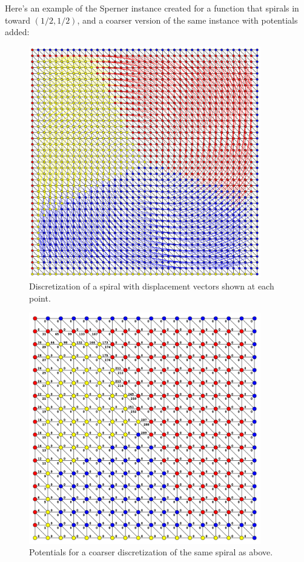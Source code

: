   Here's an example of the Sperner instance created for a function that spirals in toward $(1/2,1/2)$, and a coarser version of the same instance with potentials added:

  \begin{figure}[h]
    \caption{Discretization of a spiral with displacement vectors shown at each point.}
    \centering
    \includegraphics[width=0.9\textwidth]{ContractionToEOPL_example1_displacement}
  \end{figure}

  \begin{figure}[h]
    \caption{Potentials for a coarser discretization of the same spiral as above.}
    \centering
    \includegraphics[width=0.9\textwidth]{ContractionToEOPL_example1_potentials}
  \end{figure}

